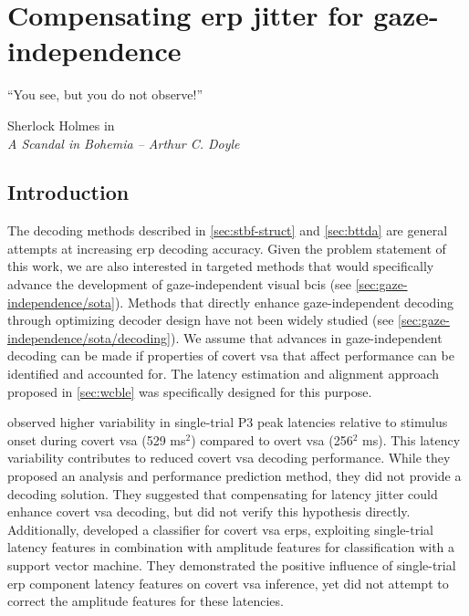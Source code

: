 \chapter{Compensating \acs{erp} jitter for gaze-independence}%
\label{sec:covert-align}
\epigraph{``You see, but you do not observe!''}{Sherlock Holmes in  \\ \emph{A
Scandal in Bohemia -- Arthur C. Doyle}}

\section{Introduction}

The decoding methods described in \cref{sec:stbf-struct} and
\cref{sec:bttda} are general attempts at increasing \ac{erp} decoding accuracy.
Given the problem statement of this work, we are also interested in targeted
methods that would specifically advance the development of gaze-independent
visual \acp{bci} (see \cref{sec:gaze-independence/sota}).
Methods that directly enhance gaze-in\-de\-pen\-dent decoding through optimizing
decoder design have not been widely studied (see
\cref{sec:gaze-independence/sota/decoding}).
We assume that advances in gaze-independent decoding can be made if properties
of covert \ac{vsa} that affect performance can be identified and accounted for.
The latency estimation and alignment approach proposed in \cref{sec:wcble}
was specifically designed for this purpose.

\textcite{Arico2014} observed higher variability in single-trial P3 peak
latencies relative to stimulus onset during covert \ac{vsa} (529 ms$^2$) compared to overt
\ac{vsa} (256$^2$ ms).
This latency variability contributes to reduced covert \ac{vsa} decoding performance.
While they proposed an analysis and performance prediction method, they did not provide a
decoding solution.
They suggested that compensating for latency jitter could enhance covert \ac{vsa}
decoding, but did not verify this hypothesis directly.
Additionally, \textcite{Hardiansyah2020} developed a classifier for
covert \ac{vsa} \acp{erp}, exploiting single-trial latency features in combination with
amplitude features for classification with a support vector machine.
They demonstrated the positive influence of single-trial \ac{erp} component latency
features on covert \ac{vsa} inference, yet did not attempt to correct the amplitude
features for these latencies.

